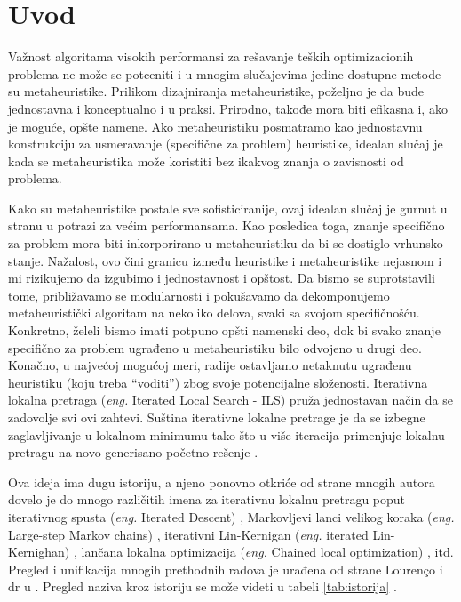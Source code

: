 \documentclass[a4paper]{article}
\newcommand{\q}[1]{``#1''}  %
\newcommand{\eng}[1]{(\textit{eng.} #1)}
\begin{document}
\section{Uvod}
\label{sec:uvod}


Važnost algoritama visokih performansi za rešavanje teških optimizacionih problema ne može se potceniti i u mnogim slučajevima jedine dostupne metode su metaheuristike. Prilikom dizajniranja metaheuristike, poželjno je da bude jednostavna i konceptualno i u praksi. Prirodno, takođe mora biti efikasna i, ako je moguće, opšte namene. Ako metaheuristiku posmatramo kao
jednostavnu konstrukciju za usmeravanje (specifične za problem) heuristike, idealan slučaj je kada se metaheuristika može koristiti bez ikakvog znanja o zavisnosti od problema.\par
Kako su metaheuristike postale sve sofisticiranije, ovaj idealan slučaj je gurnut u stranu u potrazi za većim performansama. Kao posledica toga, znanje specifično za problem mora biti inkorporirano u metaheuristiku da bi se dostiglo vrhunsko stanje. Nažalost, ovo čini granicu između heuristike i metaheuristike nejasnom i mi rizikujemo da izgubimo i jednostavnost i opštost. Da bismo se suprotstavili tome, približavamo se modularnosti i pokušavamo da dekomponujemo metaheuristički algoritam na nekoliko delova, svaki sa svojom specifičnošću.
Konkretno, želeli bismo imati potpuno opšti namenski deo, dok bi svako znanje specifično za problem ugrađeno u metaheuristiku bilo odvojeno u drugi deo. Konačno, u najvećoj mogućoj meri, radije ostavljamo netaknutu ugrađenu heuristiku (koju treba \q{voditi}) zbog svoje potencijalne složenosti. Iterativna lokalna pretraga \eng{Iterated Local Search - ILS} pruža jednostavan način da se zadovolje svi ovi zahtevi. Suština iterativne lokalne pretrage je da se izbegne zaglavljivanje u lokalnom minimumu tako što u više iteracija primenjuje lokalnu pretragu na novo generisano početno rešenje \cite{handbookOfMetaheuristics}. \par
Ova ideja ima dugu istoriju, a njeno ponovno otkriće od strane mnogih autora dovelo je do mnogo različitih imena za iterativnu lokalnu pretragu poput iterativnog spusta \eng{Iterated Descent} \cite{baum1986iterated, baum1986towards}, Markovljevi lanci velikog koraka \eng{Large-step Markov chains} \cite{largeStepMarkovChains}, iterativni Lin-Kernigan \eng{iterated Lin-Kernighan} \cite{iteratedLinKernighan}, lančana lokalna optimizacija \eng{Chained local optimization} \cite{chainedLocalOptimization}, itd. \cite{handbookOfMetaheuristics} 
Pregled i unifikacija mnogih prethodnih radova je urađena od strane Lourenço i dr u \cite{handbookOfMetaheuristics1}. Pregled naziva kroz istoriju se može videti u tabeli \ref{tab:istorija} \cite{conciseReview}.\par 
\end{document}

